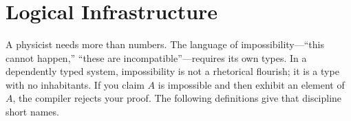 \documentclass[11pt,a4paper]{book}
\begin{document}
\begin{code}
\AgdaSpace{}%
\AgdaSymbol{(}\AgdaSpace{}%
\AgdaSymbol{(}\AgdaSpace{}%
\AgdaSymbol{(}\AgdaSpace{}%
\AgdaSymbol{(}\AgdaSpace{}%
\AgdaSymbol{(}\AgdaSpace{}%
\AgdaSymbol{(}\AgdaSpace{}%
\AgdaSymbol{(}\AgdaSpace{}%
\AgdaSymbol{(}\AgdaSpace{}%
\AgdaSymbol{(}\AgdaSpace{}%
\AgdaSymbol{)))))))))}\<%
\\
%
\\[\AgdaEmptyExtraSkip]%
\>[0]\AgdaSpace{}%
\AgdaSymbol{:}\AgdaSpace{}%
\<%
\\
\>[0]\AgdaSpace{}%
\AgdaSymbol{=}\AgdaSpace{}%
\AgdaSpace{}%
\AgdaOperator{\AgdaPrimitive{*}}\AgdaSpace{}%
\<%
\end{code}

\section{Logical Infrastructure}

A physicist needs more than numbers. The language of impossibility---``this cannot happen,'' ``these are incompatible''---requires its own types. In a dependently typed system, impossibility is not a rhetorical flourish; it is a type with no inhabitants. If you claim $A$ is impossible and then exhibit an element of $A$, the compiler rejects your proof. The following definitions give that discipline short names.
\end{document}
